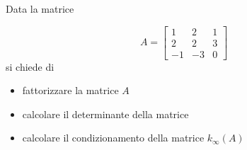 Data la matrice

\bigskip
\[
A=\left[
\begin{array}{ccc}
1 & 2 & 1 \\
2 & 2 & 3\\
-1 & -3 & 0
\end{array}\right]
\]
si chiede di
\begin{itemize}
\item
fattorizzare la matrice $A$
\item
calcolare il determinante della matrice
\item
calcolare il condizionamento della matrice $k_{\infty}(A)$
\end{itemize} 